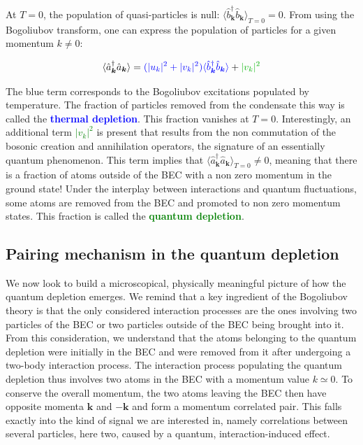 \noindent At $T=0$, the population of quasi-particles is null: $\langle \hat{b}^{\dagger}_{\bm{k}}  \hat{b}_{\bm{k}} \rangle_{T=0}=0$. From using the Bogoliubov transform, one can express the population of particles for a given momentum $k \neq 0$:

\begin{equation}
    \langle \hat{a}^{\dagger}_{\bm{k}}  \hat{a}_{\bm{k}} \rangle=\textcolor{blue}{(|u_k|^2+|v_k|^2)\langle \hat{b}^{\dagger}_{\bm{k}}  \hat{b}_{\bm{k}} \rangle} + \textcolor{green}{|v_k|^2}
\end{equation}

\noindent The blue term corresponds to the Bogoliubov excitations populated by temperature. The fraction of particles removed from the condensate this way is called the \textcolor{blue}{\textbf{thermal depletion}}. This fraction vanishes at $T=0$. Interestingly, an additional term \textcolor{green}{$|v_k|^2$} is present that results from the non commutation of the bosonic creation and annihilation operators, the signature of an essentially quantum phenomenon. This term implies that $\langle \hat{a}^{\dagger}_{\bm{k}}  \hat{a}_{\bm{k}} \rangle_{T=0} \neq 0$, meaning that there is a fraction of atoms outside of the BEC with a non zero momentum in the ground state! Under the interplay between interactions and quantum fluctuations, some atoms are removed from the BEC and promoted to non zero momentum states. This fraction is called the \textcolor{green}{\textbf{quantum depletion}}. 


\subsection{Pairing mechanism in the quantum depletion}

\label{sec:pairing_mechanism}

We now look to build a microscopical, physically meaningful picture of how the quantum depletion emerges. We remind that a key ingredient of the Bogoliubov theory is that the only considered interaction processes are the ones involving two particles of the BEC or two particles outside of the BEC being brought into it. From this consideration, we understand that the atoms belonging to the quantum depletion were initially in the BEC and were removed from it after undergoing a two-body interaction process. The interaction process populating the quantum depletion thus involves two atoms in the BEC with a momentum value $k \simeq 0$. To conserve the overall momentum, the two atoms leaving the BEC then have opposite momenta $\bm{k}$ and $-\bm{k}$ and form a momentum correlated pair. This falls exactly into the kind of signal we are interested in, namely correlations between several particles, here two, caused by a quantum, interaction-induced effect.

